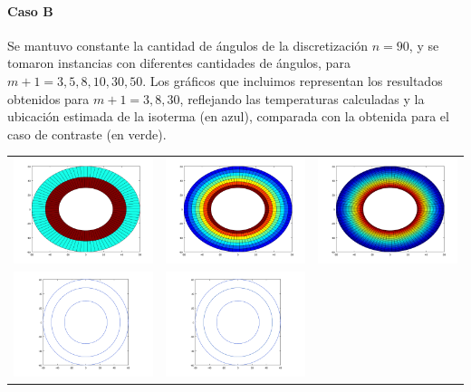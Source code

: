     \paragraph{Caso B} Se mantuvo constante la cantidad de ángulos de la discretización $n = 90$, y se tomaron instancias con diferentes cantidades de ángulos, para $m + 1 = 3, 5, 8, 10, 30, 50$. Los gráficos que incluimos representan los resultados obtenidos para $m + 1 = 3, 8, 30$, reflejando las temperaturas calculadas y la ubicación estimada de la isoterma (en azul), comparada con la obtenida para el caso de contraste (en verde).

    {\centering \begin{tabular}{ccc}
      \includegraphics[width=4.5cm]{graficos/1/1b-3.png} &
      \includegraphics[width=4.5cm]{graficos/1/1b-8.png} &
      \includegraphics[width=4.5cm]{graficos/1/1b-30.png} \\
      \includegraphics[width=4.5cm]{graficos/1/1b-3-iso.png} &
      \includegraphics[width=4.5cm]{graficos/1/1b-8-iso.png} &

\end{tabular}}
